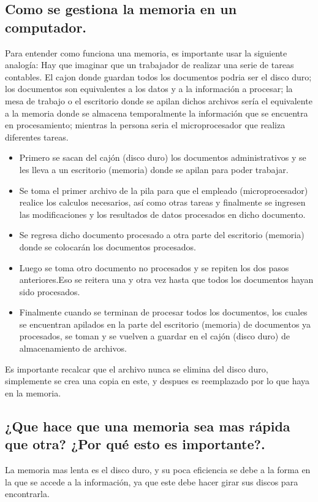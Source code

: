 \documentclass{article}
\begin{document}
\subsection{Como se gestiona la memoria en un computador.}
Para entender como funciona una memoria, es importante usar la siguiente analogía: Hay que imaginar que un trabajador de realizar una serie de tareas contables. El cajon donde guardan todos los documentos podria ser el disco duro; los documentos son equivalentes a los datos y a la información a procesar; la mesa de trabajo o el escritorio donde se apilan dichos archivos sería el equivalente a la memoria donde se almacena temporalmente la información que se encuentra en procesamiento; mientras la persona seria el microprocesador que realiza diferentes tareas.
\begin{itemize}
    \item Primero se sacan del cajón (disco duro) los documentos administrativos y se les lleva a un escritorio (memoria) donde se apilan para poder trabajar.
    \item Se toma el primer archivo de la pila para que el empleado (microprocesador) realice los calculos necesarios, así como otras tareas y finalmente se ingresen las modificaciones y los resultados de datos procesados en dicho documento.
    \item Se regresa dicho documento procesado a otra parte del escritorio (memoria) donde se colocarán los documentos procesados.
    \item Luego se toma otro documento no procesados y se repiten los dos pasos anteriores.Eso se reitera una y otra vez hasta que todos los documentos hayan sido procesados. 
    \item Finalmente cuando se terminan de procesar todos los documentos, los cuales se encuentran apilados en la parte del escritorio (memoria) de documentos ya procesados, se toman y se vuelven a guardar en el cajón (disco duro) de almacenamiento de archivos. 
  \end{itemize}  
    Es importante recalcar que el archivo nunca se elimina del disco duro, simplemente se crea una copia en este, y despues es reemplazado por lo que haya en la memoria. \cite{taller}

\subsection{¿Que hace que una memoria sea mas rápida que otra? ¿Por qué esto es importante?. }
La memoria mas lenta es el disco duro, y su poca eficiencia se debe a la forma en la que se accede a la información, ya que este debe hacer girar sus discos para encontrarla. \\
\end{document}
